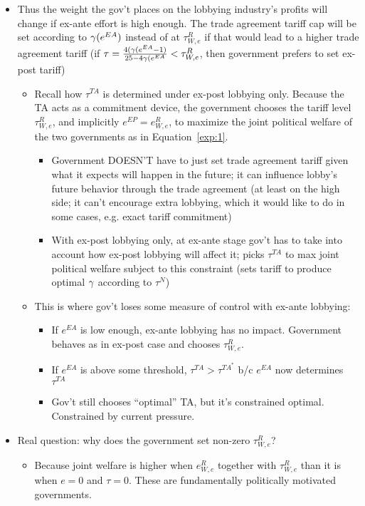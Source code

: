 \begin{itemize}
\newpage
	\item Thus the weight the gov't places on the lobbying industry's profits will change if ex-ante effort is high enough. The trade agreement tariff cap will be set according to $\gamma(e^{EA})$ instead of at $\tau^R_{W,e}$ if that would lead to a higher trade agreement tariff (if $\tau = \frac{4(\gamma(e^{EA}-1)}{25-4\gamma(e^{EA}} < \tau^R_{W,e}$, then government prefers to set ex-post tariff)
			\begin{itemize}
				\item Recall how $\tau^{TA}$ is determined under ex-post lobbying only. Because the TA acts as a commitment device, the government chooses the tariff level $\tau^R_{W,e}$, and implicitly $e^{EP}=e^R_{W,e}$, to maximize the joint political welfare of the two governments as in Equation~\ref{exp:1}.
		\begin{itemize}
			\item Government DOESN'T have to just set trade agreement tariff given what it expects will happen in the future; it can influence lobby's future behavior through the trade agreement (at least on the high side; it can't encourage extra lobbying, which it would like to do in some cases, e.g. exact tariff commitment)
			\item With ex-post lobbying only, at ex-ante stage gov't has to take into account how ex-post lobbying will affect it; picks $\tau^{TA}$ to max joint political welfare subject to this constraint (sets tariff to produce optimal $\gamma$ according to $\tau^N$)
		\end{itemize}
				\item This is where gov't loses some measure of control with ex-ante lobbying: 
					\begin{itemize}
						\item If $e^{EA}$ is low enough, ex-ante lobbying has no impact. Government behaves as in ex-post case and chooses $\tau^R_{W,e}$.
						\item If $e^{EA}$ is above some threshold, $\tau^{TA} >\tau^{TA^*}$ b/c $e^{EA}$ now determines $\tau^{TA}$
						\item Gov't still chooses ``optimal'' TA, but it's constrained optimal. Constrained by current pressure.
					\end{itemize}		
				\end{itemize}
	\item Real question: why does the government set non-zero $\tau^R_{W,e}$?
		\begin{itemize}
			\item Because joint welfare is higher when $e^R_{W,e}$ together with $\tau^R_{W,e}$ than it is when $e=0$ and $\tau=0$. These are fundamentally politically motivated governments.

\end{itemize}
\end{itemize}
